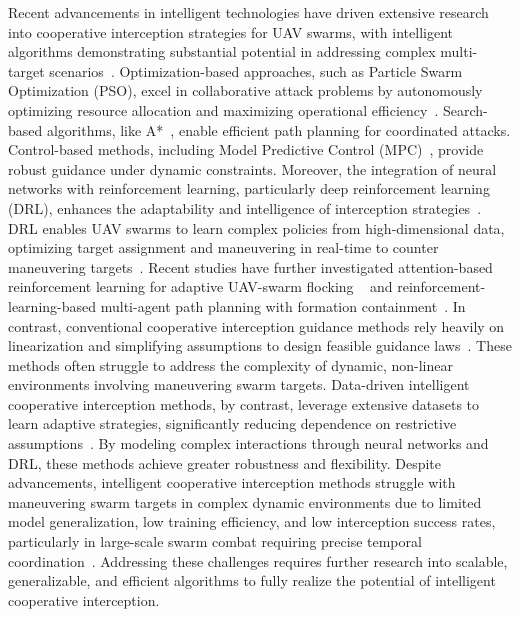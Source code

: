 \documentclass[lettersize,journal]{IEEEtran}
\begin{document}
Recent advancements in intelligent technologies have driven extensive research into cooperative
interception strategies for UAV swarms, with intelligent algorithms demonstrating substantial
potential in addressing complex multi-target scenarios~\cite{chen2024enhanced,wu2020collaborative}.
Optimization-based approaches, such as Particle Swarm Optimization (PSO), excel in
collaborative attack problems by autonomously optimizing resource allocation and maximizing
operational efficiency~\cite{zhao2024hierarchical,wu2020collaborative}.
Search-based algorithms, like A*~\cite{liao2024research}, enable efficient path planning for
coordinated attacks.
Control-based methods, including Model Predictive Control
(MPC)~\cite{kim2024adaptive}, provide robust guidance under dynamic constraints.
Moreover, the integration of neural networks with reinforcement learning, particularly deep
reinforcement learning (DRL), enhances the adaptability and intelligence of interception
strategies~\cite{luo2022uav,zhan2022multiple,wang2021uav}.
DRL enables UAV swarms to learn complex policies from high-dimensional data, optimizing target
assignment and maneuvering in real-time to counter maneuvering targets~\cite{sun2024memory}.
Recent studies have further investigated attention-based
reinforcement learning for adaptive UAV-swarm flocking
~\cite{mu2026attention} and reinforcement-learning-based multi-agent path
planning with formation containment~\cite{li2026path}.
In contrast, conventional cooperative interception guidance methods rely heavily on
linearization and simplifying assumptions to design feasible guidance laws~\cite{zhao2025global}.
These methods often struggle to address the complexity of dynamic, non-linear environments
involving maneuvering swarm targets.
Data-driven intelligent cooperative interception methods, by contrast, leverage extensive
datasets to learn adaptive strategies, significantly reducing dependence on restrictive
assumptions~\cite{fainkich2025cooperative}.
By modeling complex interactions through neural networks and DRL, these methods achieve greater
robustness and flexibility.
Despite advancements, intelligent cooperative interception methods struggle with maneuvering
swarm targets in complex dynamic environments due to limited model generalization, low training
efficiency, and low interception success rates, particularly in large-scale swarm combat
requiring precise temporal coordination~\cite{horyna2023decentralized}.
Addressing these challenges requires further research into scalable, generalizable, and
efficient algorithms to fully realize the potential of intelligent cooperative interception.
\end{document}
